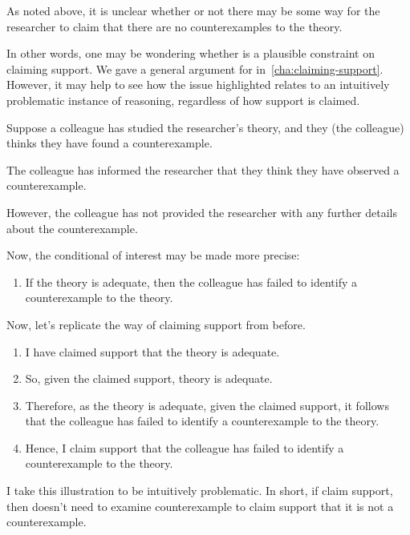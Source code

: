 \begin{note}
  As noted above, it is unclear whether or not there may be some way for the researcher to claim that there are no counterexamples to the theory.

  In other words, one may be wondering whether \ideaCS{} is a plausible constraint on claiming support.
  We gave a general argument for \ideaCS{} in~\autoref{cha:claiming-support}.
  However, it may help to see how the issue highlighted relates to an intuitively problematic instance of reasoning, regardless of how support is claimed.

  \begin{illustration}\label{ill:CE:colleague}
    Suppose a colleague has studied the researcher's theory, and they (the colleague) thinks they have found a counterexample.

    The colleague has informed the researcher that they think they have observed a counterexample.

    However, the colleague has not provided the researcher with any further details about the counterexample.

    Now, the conditional of interest may be made more precise:
    \begin{enumerate}
    \item If the theory is adequate, then the colleague has failed to identify a counterexample to the theory.
    \end{enumerate}

    Now, let's replicate the way of claiming support from before.

    \begin{enumerate}
    \item I have claimed support that the theory is adequate.
    \item So, given the claimed support, theory is adequate.
    \item Therefore, as the theory is adequate, given the claimed support, it follows that the colleague has failed to identify a counterexample to the theory.
    \item Hence, I claim support that the colleague has failed to identify a counterexample to the theory.
    \end{enumerate}
    \vspace{-\baselineskip}
  \end{illustration}

  I take this illustration to be intuitively problematic.
  In short, if claim support, then doesn't need to examine counterexample to claim support that it is not a counterexample.


\end{note}
